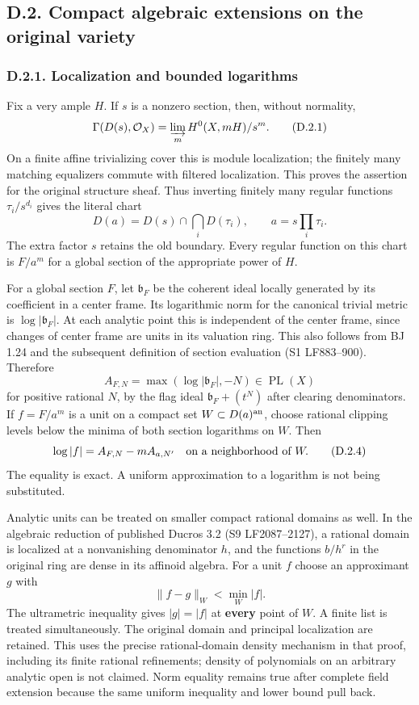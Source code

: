 \documentclass[
  10pt,
]{article}
\begin{document}
\subsection{D.2. Compact algebraic extensions on the original
variety}\label{d.2.-compact-algebraic-extensions-on-the-original-variety}

\subsubsection{D.2.1. Localization and bounded
logarithms}\label{d.2.1.-localization-and-bounded-logarithms}

Fix a very ample \(H\). If \(s\) is a nonzero section, then, without
normality,
\[\Gamma(D(s),\mathcal O_X)=\varinjlim_m H^0(X,mH)/s^m. \tag{D.2.1}\] On
a finite affine trivializing cover this is module localization; the
finitely many matching equalizers commute with filtered localization.
This proves the assertion for the original structure sheaf. Thus
inverting finitely many regular functions \(\tau_i/s^{d_i}\) gives the
literal chart
\[D(a)=D(s)\cap\bigcap_iD(\tau_i),\qquad a=s\prod_i\tau_i. \tag{D.2.2}\]
The extra factor \(s\) retains the old boundary. Every regular function
on this chart is \(F/a^m\) for a global section of the appropriate power
of \(H\).

For a global section \(F\), let \(\mathfrak b_F\) be the coherent ideal
locally generated by its coefficient in a center frame. Its logarithmic
norm for the canonical trivial metric is \(\log|\mathfrak b_F|\). At
each analytic point this is independent of the center frame, since
changes of center frame are units in its valuation ring. This also
follows from BJ 1.24 and the subsequent definition of section evaluation
(S1 LF883--900). Therefore
\[A_{F,N}=\max(\log|\mathfrak b_F|,-N)\in\operatorname{PL}(X) \tag{D.2.3}\]
for positive rational \(N\), by the flag ideal \(\mathfrak b_F+(t^N)\)
after clearing denominators. If \(f=F/a^m\) is a unit on a compact set
\(W\subset D(a)^{\rm an}\), choose rational clipping levels below the
minima of both section logarithms on \(W\). Then
\[\log|f|=A_{F,N}-m A_{a,N'}\quad\hbox{on a neighborhood of }W. \tag{D.2.4}\]
The equality is exact. A uniform approximation to a logarithm is not
being substituted.

Analytic units can be treated on smaller compact rational domains as
well. In the algebraic reduction of published Ducros 3.2 (S9
LF2087--2127), a rational domain is localized at a nonvanishing
denominator \(h\), and the functions \(b/h^r\) in the original ring are
dense in its affinoid algebra. For a unit \(f\) choose an approximant
\(g\) with \[\|f-g\|_W<\min_W|f|.\] The ultrametric inequality gives
\(|g|=|f|\) at \textbf{every} point of \(W\). A finite list is treated
simultaneously. The original domain and principal localization are
retained. This uses the precise rational-domain density mechanism in
that proof, including its finite rational refinements; density of
polynomials on an arbitrary analytic open is not claimed. Norm equality
remains true after complete field extension because the same uniform
inequality and lower bound pull back.
\end{document}

